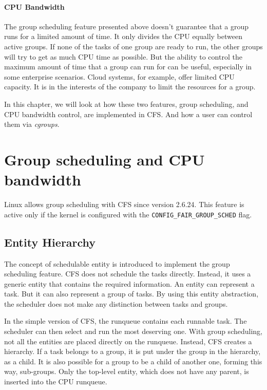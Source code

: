 \paragraph{CPU Bandwidth}
The group scheduling feature presented above doesn't guarantee that a group runs for a limited amount of time. It only divides the CPU equally between active groups. If none of the tasks of one group are ready to run, the other groups will try to get as much CPU time as possible. But the ability to control the maximum amount of time that a group can run for can be useful, especially in some enterprise scenarios.  Cloud systems, for example, offer limited CPU capacity. It is in the interests of the company to limit the resources for a group.

In this chapter, we will look at how these two features, group scheduling, and CPU bandwidth control, are implemented in CFS. And how a user can control them via \textit{cgroups}.

\section{Group scheduling and CPU bandwidth}

Linux allows group scheduling with CFS since version 2.6.24. This feature is active only if the kernel is configured with the \verb|CONFIG_FAIR_GROUP_SCHED| flag.

\subsection{Entity Hierarchy}

The concept of schedulable entity is introduced to implement the group scheduling feature. CFS does not schedule the tasks directly. Instead, it uses a generic entity that contains the required information. An entity can represent a task. But it can also represent a group of tasks. By using this entity abstraction, the scheduler does not make any distinction between tasks and groups.

In the simple version of CFS, the runqueue contains each runnable task. The scheduler can then select and run the most deserving one.
With group scheduling, not all the entities are placed directly on the runqueue. Instead, CFS creates a hierarchy. If a task belongs to a group, it is put under the group in the hierarchy, as a child. It is also possible for a group to be a child of another one, forming this way, sub-groups. Only the top-level entity, which does not have any parent, is inserted into the CPU runqueue.

